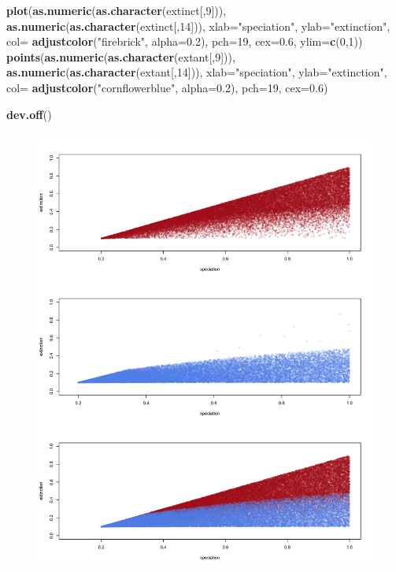 \documentclass[]{book}
\newenvironment{Shaded}{\begin{snugshade}}{\end{snugshade}}
\newcommand{\KeywordTok}[1]{\textcolor[rgb]{0.13,0.29,0.53}{\textbf{{#1}}}}
\newcommand{\DataTypeTok}[1]{\textcolor[rgb]{0.13,0.29,0.53}{{#1}}}
\newcommand{\DecValTok}[1]{\textcolor[rgb]{0.00,0.00,0.81}{{#1}}}
\newcommand{\FloatTok}[1]{\textcolor[rgb]{0.00,0.00,0.81}{{#1}}}
\newcommand{\StringTok}[1]{\textcolor[rgb]{0.31,0.60,0.02}{{#1}}}
\newcommand{\NormalTok}[1]{{#1}}
\theoremstyle{definition}
\theoremstyle{definition}
\theoremstyle{remark}
\begin{document}
\begin{Shaded}
\begin{Highlighting}[]
\KeywordTok{plot}\NormalTok{(}\KeywordTok{as.numeric}\NormalTok{(}\KeywordTok{as.character}\NormalTok{(extinct[,}\DecValTok{9}\NormalTok{])), }\KeywordTok{as.numeric}\NormalTok{(}\KeywordTok{as.character}\NormalTok{(extinct[,}\DecValTok{14}\NormalTok{])), }\DataTypeTok{xlab=}\StringTok{"speciation"}\NormalTok{, }\DataTypeTok{ylab=}\StringTok{"extinction"}\NormalTok{, }\DataTypeTok{col=} \KeywordTok{adjustcolor}\NormalTok{(}\StringTok{"firebrick"}\NormalTok{, }\DataTypeTok{alpha=}\FloatTok{0.2}\NormalTok{), }\DataTypeTok{pch=}\DecValTok{19}\NormalTok{, }\DataTypeTok{cex=}\FloatTok{0.6}\NormalTok{, }\DataTypeTok{ylim=}\KeywordTok{c}\NormalTok{(}\DecValTok{0}\NormalTok{,}\DecValTok{1}\NormalTok{))}
\KeywordTok{points}\NormalTok{(}\KeywordTok{as.numeric}\NormalTok{(}\KeywordTok{as.character}\NormalTok{(extant[,}\DecValTok{9}\NormalTok{])), }\KeywordTok{as.numeric}\NormalTok{(}\KeywordTok{as.character}\NormalTok{(extant[,}\DecValTok{14}\NormalTok{])), }\DataTypeTok{xlab=}\StringTok{"speciation"}\NormalTok{, }\DataTypeTok{ylab=}\StringTok{"extinction"}\NormalTok{, }\DataTypeTok{col=} \KeywordTok{adjustcolor}\NormalTok{(}\StringTok{"cornflowerblue"}\NormalTok{, }\DataTypeTok{alpha=}\FloatTok{0.2}\NormalTok{), }\DataTypeTok{pch=}\DecValTok{19}\NormalTok{, }\DataTypeTok{cex=}\FloatTok{0.6}\NormalTok{)}


\KeywordTok{dev.off}\NormalTok{()}
\end{Highlighting}
\end{Shaded}

\begin{figure}
\centering
\includegraphics{extiction minus extant per outcome.png}
\caption{}
\end{figure}
\end{document}
